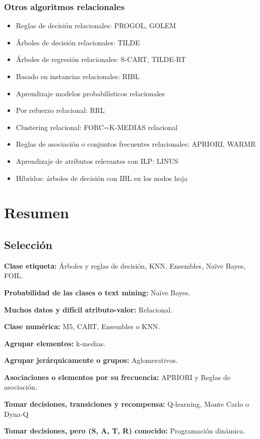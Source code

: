 \documentclass[12pt, twoside, openright]{report} %
\begin{document}
\subsection{Otros algoritmos relacionales}
\begin{itemize}
  \item Reglas de decisión relacionales: PROGOL, GOLEM
  \item Árboles de decisión relacionales: TILDE
  \item Árboles de regresión relacionales: S-CART, TILDE-RT
  \item Basado en instancias relacionales: RIBL
  \item Aprendizaje modelos probabilísticos relacionales
  \item Por refuerzo relacional: RRL
  \item Clustering relacional: FORC=K-MEDIAS relacional
  \item Reglas de asociación o conjuntos frecuentes relacionales: APRIORI, WARMR
  \item Aprendizaje de atributos relevantes con ILP: LINUS
  \item Híbridos: árboles de decisión con IBL en los nodos hoja
\end{itemize}

\chapter{Resumen}
\section{Selección}
\textbf{Clase etiqueta:} Árboles y reglas de decisión, KNN, Ensembles, Naïve Bayes, FOIL.

\textbf{Probabilidad de las clases o text mining:} Naïve Bayes.

\textbf{Muchos datos y difícil atributo-valor:} Relacional.

\textbf{Clase numérica:} M5, CART, Ensembles o KNN.

\textbf{Agrupar elementos:} k-medias.

\textbf{Agrupar jerárquicamente o grupos:} Aglomerativos.

\textbf{Asociaciones o elementos por su frecuencia:} APRIORI y Reglas de asociación.

\textbf{Tomar decisiones, transiciones y recompensa:} Q-learning, Monte Carlo o Dyna-Q

\textbf{Tomar decisiones, pero (S, A, T, R) conocido:} Programación dinámica.
\end{document}
